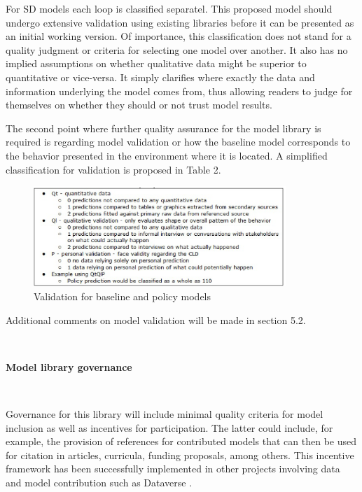 \documentclass[11pt]{article}
\begin{document}
For SD models each loop is classified separatel. This proposed model should undergo extensive validation using existing libraries before it can be presented as an initial working version.  Of importance, this classification does not stand for a quality judgment or criteria for selecting one model over another.  It also has no implied assumptions on whether qualitative data might be superior to quantitative or vice-versa.  It simply clarifies where exactly the data and information underlying the model comes from, thus allowing readers to judge for themselves on whether they should or not trust model results. 

The second point where further quality assurance for the model library is required is regarding model validation or how the baseline model corresponds to the behavior presented in the environment where it is located.  A simplified classification for validation is proposed in Table 2. 

\begin{figure}[htbp]
	\centering
		\includegraphics[width=0.85\textwidth]{quadro2.ps}
	\caption{Validation for baseline and policy models }
	\label{fig:quadro2}
\end{figure}

Additional comments on model validation will be made in section 5.2.

\

\noindent \textbf{Model library governance}

\

Governance for this library will include minimal quality criteria for model inclusion as well as incentives for participation.  The latter could include, for example, the provision of references for contributed models that can then be used for citation in articles, curricula, funding proposals, among others.  This incentive framework has been successfully implemented in other projects involving data and model contribution such as Dataverse \cite{thedata}.
\end{document}
